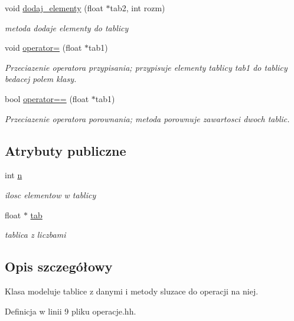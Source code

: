 \begin{DoxyCompactItemize}
void \hyperlink{classoperacje_a933533caa39434db543aca704804625c}{dodaj\-\_\-elementy} (float $\ast$tab2, int rozm)
\begin{DoxyCompactList}\small\item\em metoda dodaje elementy do tablicy \end{DoxyCompactList}\item 
void \hyperlink{classoperacje_a33127b613894949faba7a04f23075bf8}{operator=} (float $\ast$tab1)
\begin{DoxyCompactList}\small\item\em \-Przeciazenie operatora przypisania; przypisuje elementy tablicy {\ttfamily tab1} {\ttfamily do} tablicy bedacej polem klasy. \end{DoxyCompactList}\item 
bool \hyperlink{classoperacje_af69f25c4d1da5a7e46ff21a56143fc62}{operator==} (float $\ast$tab1)
\begin{DoxyCompactList}\small\item\em \-Przeciazenie operatora porownania; metoda porownuje zawartosci dwoch tablic. \end{DoxyCompactList}\end{DoxyCompactItemize}
\subsection*{\-Atrybuty publiczne}
\begin{DoxyCompactItemize}
\item 
int \hyperlink{classoperacje_aec7cc301d8822128d918aa1f9c7e1db2}{n}
\begin{DoxyCompactList}\small\item\em ilosc elementow w tablicy \end{DoxyCompactList}\item 
float $\ast$ \hyperlink{classoperacje_ad23bc418eebc9b493a5494ffd9358dd0}{tab}
\begin{DoxyCompactList}\small\item\em tablica z liczbami \end{DoxyCompactList}\end{DoxyCompactItemize}


\subsection{\-Opis szczegółowy}
\-Klasa modeluje tablice z danymi i metody sluzace do operacji na niej. 

\-Definicja w linii 9 pliku operacje.\-hh.



